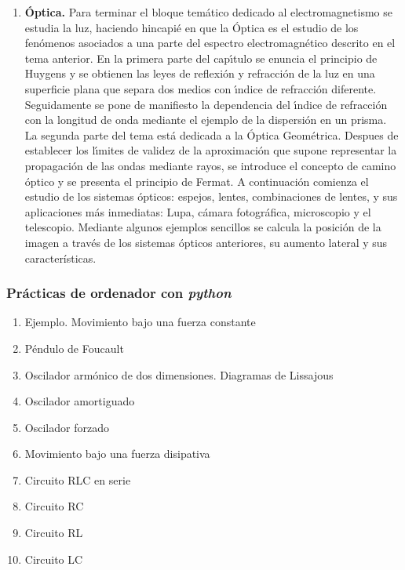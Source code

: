 \begin{enumerate} [{\bf 1. }]
\item {\bf \'{O}ptica.}
Para terminar el bloque tem\'{a}tico dedicado al electromagnetismo se estudia la luz,
 haciendo hincapi\'{e} en que la \'{O}ptica es el estudio de los fen\'{o}menos 
asociados a una parte del espectro electromagn\'{e}tico descrito en el tema anterior.
 En la primera parte del cap\'{\i}tulo se enuncia el principio de Huygens y se
 obtienen las leyes de reflexi\'{o}n y refracci\'{o}n de la luz en una superficie
 plana que separa dos medios con \'{\i}ndice de refracci\'{o}n diferente.
 Seguidamente se pone de manifiesto la dependencia del \'{\i}ndice de refracci\'{o}n
 con la longitud de onda mediante el ejemplo de la dispersi\'{o}n en un prisma.
 La segunda parte del tema est\'{a} dedicada a la \'{O}ptica Geom\'{e}trica.
 Despues de establecer los l\'{\i}mites de validez de la aproximaci\'{o}n que 
supone  representar la propagaci\'{o}n de las ondas mediante rayos,
 se introduce 
el concepto de camino \'{o}ptico y se presenta el principio de Fermat.
 A continuaci\'{o}n comienza el estudio de los sistemas \'{o}pticos: espejos, lentes, 
combinaciones de lentes, y sus aplicaciones m\'{a}s inmediatas:  
Lupa, c\'{a}mara fotogr\'{a}fica, microscopio y el telescopio. Mediante algunos ejemplos 
sencillos se calcula la posici\'{o}n de la imagen a trav\'{e}s de los sistemas 
\'{o}pticos anteriores, su aumento lateral y sus características. 


\end{enumerate}


\subsubsection{\large Pr\'{a}cticas de ordenador con {\it python}}
\begin{enumerate}
\item Ejemplo. Movimiento bajo una fuerza constante
\item P\'{e}ndulo de Foucault
\item Oscilador arm\'{o}nico de dos dimensiones. Diagramas de Lissajous
\item Oscilador amortiguado
\item Oscilador forzado
\item Movimiento bajo una fuerza disipativa
\item Circuito RLC en serie
\item Circuito RC
\item Circuito RL
\item Circuito LC
\end{enumerate}


